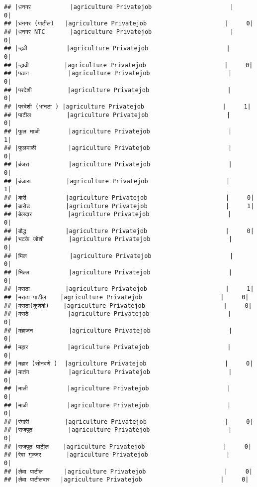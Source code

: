 \documentclass[
]{article}
\begin{document}
\begin{verbatim}
## |धनगर           |agriculture Privatejob                      |     0|
## |धनगर (पाटील)   |agriculture Privatejob                      |     0|
## |धनगर NTC       |agriculture Privatejob                      |     0|
## |न्हवी           |agriculture Privatejob                      |     0|
## |न्हावी          |agriculture Privatejob                      |     0|
## |पठान           |agriculture Privatejob                      |     0|
## |परदेशी          |agriculture Privatejob                      |     0|
## |परदेशी (भानटा ) |agriculture Privatejob                      |     1|
## |पाटील          |agriculture Privatejob                      |     0|
## |फुल माळी        |agriculture Privatejob                      |     1|
## |फुलमाळी         |agriculture Privatejob                      |     0|
## |बंजरा           |agriculture Privatejob                      |     0|
## |बंजारा          |agriculture Privatejob                      |     1|
## |बारी           |agriculture Privatejob                      |     0|
## |बारोड          |agriculture Privatejob                      |     1|
## |बेलदार          |agriculture Privatejob                      |     0|
## |बौद्ध           |agriculture Privatejob                      |     0|
## |भटके जोशी       |agriculture Privatejob                      |     0|
## |भिल            |agriculture Privatejob                      |     0|
## |भिल्ल           |agriculture Privatejob                      |     0|
## |मराठा          |agriculture Privatejob                      |     1|
## |मराठा पाटील    |agriculture Privatejob                      |     0|
## |मराठा(कुणबी)    |agriculture Privatejob                      |     0|
## |मराठे           |agriculture Privatejob                      |     0|
## |महाजन          |agriculture Privatejob                      |     0|
## |महार           |agriculture Privatejob                      |     0|
## |महार (सोनवणे )  |agriculture Privatejob                      |     0|
## |मातंग           |agriculture Privatejob                      |     0|
## |माली           |agriculture Privatejob                      |     0|
## |माळी           |agriculture Privatejob                      |     0|
## |रंगारी          |agriculture Privatejob                      |     0|
## |राजपूत          |agriculture Privatejob                      |     0|
## |राजपूत पाटील    |agriculture Privatejob                      |     0|
## |रेवा गुज्जर       |agriculture Privatejob                      |     0|
## |लेवा पाटील      |agriculture Privatejob                      |     0|
## |लेवा पाटीलदार   |agriculture Privatejob                      |     0|

\end{verbatim}
\end{document}
